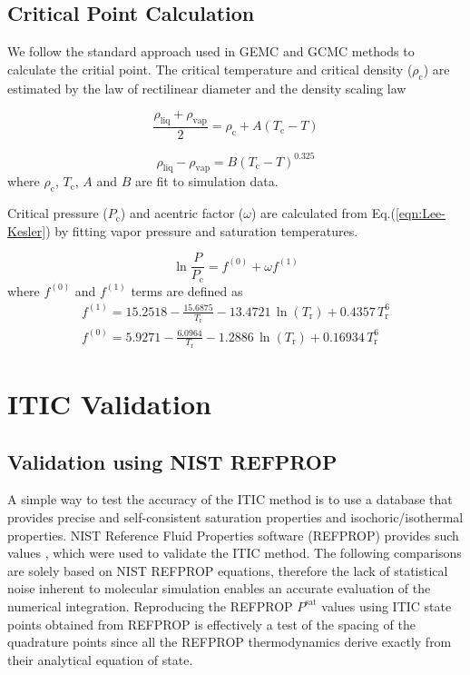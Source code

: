\documentclass[5p,times]{elsarticle}
\begin{document}
\subsection{Critical Point Calculation}\label{sec:PcCalc}
We follow the standard approach used in GEMC and GCMC methods to calculate the critial point. The critical temperature and critical density ($\rho_\mathrm{c}$) are estimated by the law of rectilinear diameter \cite{Rowlinson1982} and the density scaling law \cite{Rowlinson2013}

\begin{equation}
\frac{\rho_{\mathrm{liq}} +\rho_{\mathrm{vap}}}{2}=\rho_\mathrm{c}+A(T_\mathrm{c}-T)
\label{eqn:rectilinearLaw}
\end{equation}

\begin{equation}
\rho_{\mathrm{liq}} -\rho_{\mathrm{vap}}=B(T_\mathrm{c}-T)^{0.325}
\label{eqn:scalingLaw}
\end{equation}
where $\rho_\mathrm{c}$, $ T_\mathrm{c}$, $A$ and $B$ are fit to simulation data.

Critical pressure ($P_\mathrm{c}$) and acentric factor ($\omega$) are calculated from Eq.(\ref{eqn:Lee-Kesler}) \cite{Lee1975} by fitting vapor pressure and saturation temperatures.
			
\begin{equation}
{\ln \frac{P}{P_\mathrm{c}}=f^{(0)}+\omega f^{(1)}} 
\label{eqn:Lee-Kesler}
\end{equation}
where $f^{(0)}$ and $f^{(1)}$ terms are defined as
\begin{equation}
\begin{array}{l} 
{f^{(1)} = 15.2518 - \frac{15.6875}{T_\mathrm{r}} - 13.4721 \, \ln(T_\mathrm{r}) +   0.4357 \, T_\mathrm{r}^6 } \\ 
{ f^{(0)} = 5.9271 - \frac{6.0964}{T_\mathrm{r}} - 1.2886 \, \ln(T_\mathrm{r}) + 0.16934 \, T_\mathrm{r}^6  } 
\end{array} \label{eqn:Lee-Kesler-terms}
\end{equation}


\section{ITIC Validation}\label{sec:NIST-VAL}
\subsection{Validation using NIST REFPROP} 
A simple way to test the accuracy of the ITIC method is to use a database that provides precise and self-consistent saturation properties and isochoric/isothermal properties. NIST Reference Fluid Properties software (REFPROP) provides such values \cite{LEMMON-RP91}, which were used to validate the ITIC method. The following comparisons are solely based on NIST REFPROP equations, therefore the lack of statistical noise inherent to molecular simulation enables an accurate evaluation of the numerical integration. Reproducing the REFPROP $P^{\mathrm{sat}}$ values using ITIC state points obtained from REFPROP is effectively a test of the spacing of the quadrature points since all the REFPROP thermodynamics derive exactly from their analytical equation of state.
\end{document}
